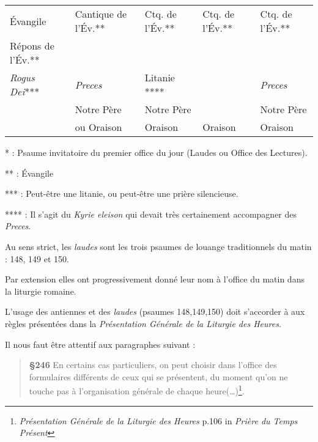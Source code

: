\documentclass[oneside, 10pt]{article}
\begin{document}
\begin{center}
\begin{tabular}{ | l | l | l | l | l | }
Évangile                & Cantique de l'Év.**     & Ctq. de l'Év.**         & Ctq. de l'Év.**        & Ctq. de l'Év.** \\
Répons de l'Év.**       &                         &                         &                        &        \\
\textit{Rogus Dei}***   & \textit{Preces}         & Litanie ****            &                   & \textit{Preces} \\
                        & Notre Père              & Notre Père              &                        & Notre Père \\
                        & ou Oraison              & Oraison                 & Oraison                & Oraison \\
\hline
\end{tabular}
\end{center}

*   : Psaume invitatoire du premier office du jour (Laudes ou Office des Lectures).

**  : Évangile

*** : Peut-être une litanie, ou peut-être une prière silencieuse.

**** : Il s'agit du \emph{Kyrie eleison} qui devait très certainement accompagner des \emph{Preces}.

\newpage
{}

Au sens strict, les \emph{laudes} sont les trois psaumes de louange traditionnels du matin : 148, 149 et 150.

Par extension elles ont progressivement donné leur nom à l'office du matin dans la liturgie romaine.

L'usage des antiennes et des \emph{laudes} (psaumes 148,149,150) doit s'accorder à aux règles présentées dans la \emph{Présentation Générale de la Liturgie des Heures}. 

Il nous faut être attentif aux paragraphes suivant :

\begin{quotation}
\textbf{§246} En certains cas particuliers, on peut choisir dans l'office des formulaires différents de ceux qui se présentent, du moment qu'on ne touche pas à l'organisation générale de chaque heure(\dots)\footnote{\emph{Présentation Générale de la Liturgie des Heures} p.106 in \emph{Prière du Temps Présent}}.
\end{quotation}
\end{document}

